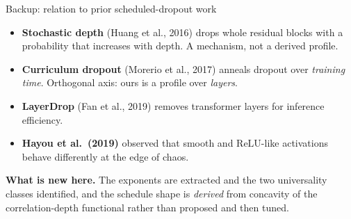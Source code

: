 \documentclass[aspectratio=169,10pt]{beamer}
\newcommand{\relu}{\mathrm{ReLU}}
\begin{document}
\begin{frame}{Backup: relation to prior scheduled-dropout work}
  \begingroup
  \small
  \begin{itemize}
    \setlength{\itemsep}{0.40em}
    \item \textbf{Stochastic depth} (Huang et al., 2016) drops whole
      residual blocks with a probability that increases with depth. A
      mechanism, not a derived profile.
    \item \textbf{Curriculum dropout} (Morerio et al., 2017) anneals
      dropout over \emph{training time}. Orthogonal axis: ours is a
      profile over \emph{layers}.
    \item \textbf{LayerDrop} (Fan et al., 2019) removes transformer layers
      for inference efficiency.
    \item \textbf{Hayou et al.\ (2019)} observed that smooth and
      \(\relu\)-like activations behave differently at the edge of chaos.
  \end{itemize}

  \vspace{0.55em}
  {\color{forest}\bfseries What is new here.} The exponents are extracted
  and the two universality classes identified, and the schedule shape is
  \emph{derived} from concavity of the correlation-depth functional rather
  than proposed and then tuned.
  \endgroup
\end{frame}
\end{document}
